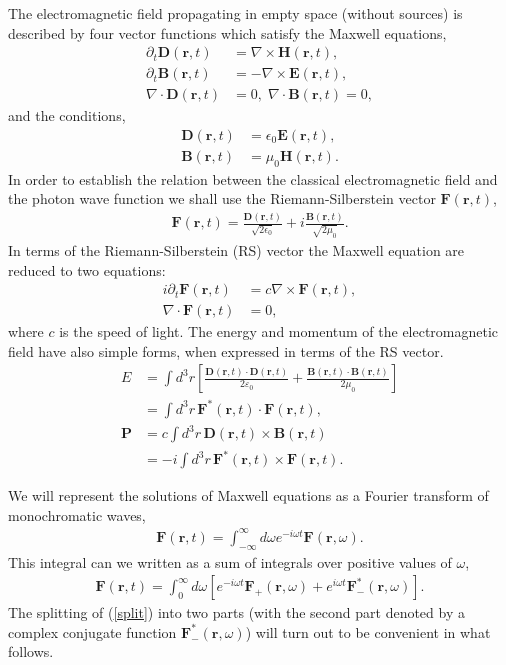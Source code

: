 \documentclass[onecolumn,aps,pra,12pt]{revtex4-1}
\begin{document}
The electromagnetic field propagating in empty space (without sources) is described by four vector functions which satisfy the Maxwell equations,
\begin{align}\label{max}
\partial_t{\bm D}({\bm r},t)&=\nabla\times{\bm H}({\bm r},t),\\
\partial_t{\bm B}({\bm r},t)&=-\nabla\times{\bm E}({\bm r},t),\\
\nabla\cdot{\bm D}({\bm r},t)&=0,\;\nabla\cdot{\bm B}({\bm r},t)=0,
\end{align}
and the conditions,
\begin{align}\label{cond}
{\bm D}({\bm r},t)&=\epsilon_0{\bm E}({\bm r},t),\\
{\bm B}({\bm r},t)&=\mu_0{\bm H}({\bm r},t).
\end{align}
In order to establish the relation between the classical electromagnetic field and the photon wave function we shall use \cite{qed,sil,pwf,rs} the Riemann-Silberstein vector ${\bm F}({\bm r},t)$,
\begin{align}\label{rs}
{\bm F}({\bm r},t)=\frac{{\bm D}({\bm r},t)}{\sqrt{2\epsilon_0}}+i\frac{{\bm B}({\bm r},t)}{\sqrt{2\mu_0}}.
\end{align}
In terms of the Riemann-Silberstein (RS) vector the Maxwell equation are reduced to two equations:
\begin{align}
i\partial_t{\bm F}({\bm r},t)&=c\nabla\times{\bm F}({\bm r},t),\label{maxrs}\\
\nabla\cdot{\bm F}({\bm r},t)&=0,\label{div}
\end{align}
where $c$ is the speed of light. The energy and momentum of the electromagnetic field have also simple forms, when expressed in terms of the RS vector.
\begin{align}
E&=\int\!\!d^3r\left[\frac{{\bm D}(\bm r,t)\!\cdot\!{\bm D}(\bm r,t)}{2\varepsilon_0}+\frac{{\bm B}(\bm r,t)\!\cdot\!{\bm B}(\bm r,t)}{2\mu_0}\right]\nonumber\\
&=\int\!d^3r\,{\bm F}^*(\bm r,t)\!\cdot\!{\bm F}(\bm r,t),\label{enf}\\
{\bm P}&=c\int\!d^3r\,{\bm D}(\bm r,t)\times{\bm B}(\bm r,t)\nonumber\\
&=-i\int\!d^3r\,{\bm F}^*(\bm r,t)\times{\bm F}(\bm r,t).\label{momf}
\end{align}

We will represent the solutions of Maxwell equations as a Fourier transform of monochromatic waves,
\begin{align}\label{genf}
{\bm F}({\bm r},t)=\int_{-\infty}^\infty\!d\omega e^{-i\omega t}{\bm{F}}({\bm r},\omega).
\end{align}
This integral can we written as a sum of integrals over positive values of $\omega$,
\begin{align}\label{split}
{\bm F}({\bm r},t)=\int_0^\infty\!d\omega\left[e^{-i\omega t}{\bm F}_+({\bm r},\omega) + e^{i\omega t}{\bm F}^*_-({\bm r},\omega)\right].
\end{align}
The splitting of (\ref{split}) into two parts (with the second part denoted by a complex conjugate function ${\bm F}^*_-({\bm r},\omega)$) will turn out to be convenient in what follows.
\end{document}
